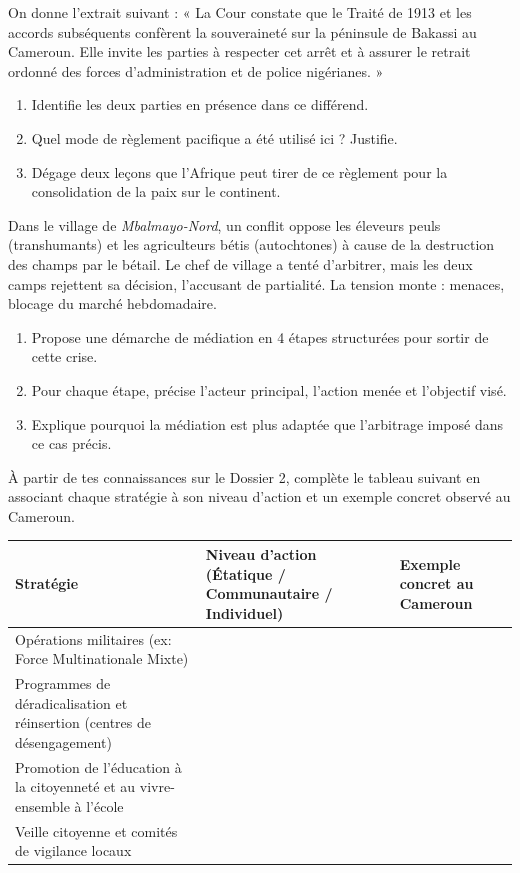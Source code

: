 \documentclass[11pt]{article}
\newcounter{popsec}
\newcounter{popsub}
\newcommand{\courssub}[1]{%
  \stepcounter{popsub}%
  \par\vspace{9pt}\noindent{\popxbold\fontsize{11.5}{13}\selectfont\color{popink}{\color{poporange}\thepopsec.\thepopsub}\hspace{6pt}#1}\par\nopagebreak\vspace{4pt}
}
\begin{document}
\courssub{Je m'entraîne}

\begin{exercice}
On donne l'extrait suivant : « La Cour constate que le Traité de 1913 et les accords subséquents confèrent la souveraineté sur la péninsule de Bakassi au Cameroun. Elle invite les parties à respecter cet arrêt et à assurer le retrait ordonné des forces d'administration et de police nigérianes. »
\begin{enumerate}
\item Identifie les deux parties en présence dans ce différend.
\item Quel mode de règlement pacifique a été utilisé ici ? Justifie.
\item Dégage deux leçons que l'Afrique peut tirer de ce règlement pour la consolidation de la paix sur le continent.
\end{enumerate}
\end{exercice}

\begin{exercice}
Dans le village de \emph{Mbalmayo-Nord}, un conflit oppose les éleveurs peuls (transhumants) et les agriculteurs bétis (autochtones) à cause de la destruction des champs par le bétail. Le chef de village a tenté d'arbitrer, mais les deux camps rejettent sa décision, l'accusant de partialité. La tension monte : menaces, blocage du marché hebdomadaire.
\begin{enumerate}
\item Propose une démarche de médiation en 4 étapes structurées pour sortir de cette crise.
\item Pour chaque étape, précise l'acteur principal, l'action menée et l'objectif visé.
\item Explique pourquoi la médiation est plus adaptée que l'arbitrage imposé dans ce cas précis.
\end{enumerate}
\end{exercice}

\begin{exercice}
À partir de tes connaissances sur le Dossier 2, complète le tableau suivant en associant chaque stratégie à son niveau d'action et un exemple concret observé au Cameroun.
\begin{center}
\begin{tabularx}{\linewidth}{|X|X|X|}
\hline
\textbf{Stratégie} & \textbf{Niveau d'action (Étatique / Communautaire / Individuel)} & \textbf{Exemple concret au Cameroun} \\
\hline
Opérations militaires (ex: Force Multinationale Mixte) & & \\
\hline
Programmes de déradicalisation et réinsertion (centres de désengagement) & & \\
\hline
Promotion de l'éducation à la citoyenneté et au vivre-ensemble à l'école & & \\
\hline
Veille citoyenne et comités de vigilance locaux & & \\
\hline
\end{tabularx}
\end{center}
\end{exercice}
\end{document}
